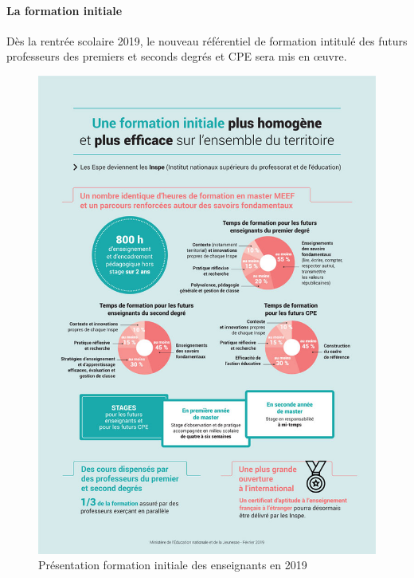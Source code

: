         \paragraph{La formation initiale}\label{sec:formation}
            Dès la rentrée scolaire 2019, le nouveau référentiel de formation intitulé  des futurs professeurs des premiers et seconds degrés et CPE sera mis en œuvre.
            \begin{figure}[!h]
            \begin{minipage}{0.55\linewidth}
                \centering
                \includegraphics[width=\linewidth]{Figures/gouv_Formation_Inspe_1150278.jpg}
                \caption{Présentation formation initiale des enseignants en 2019}
                \label{fig:formation_prof}
            \end{minipage}
            \hfill

\end{figure}
